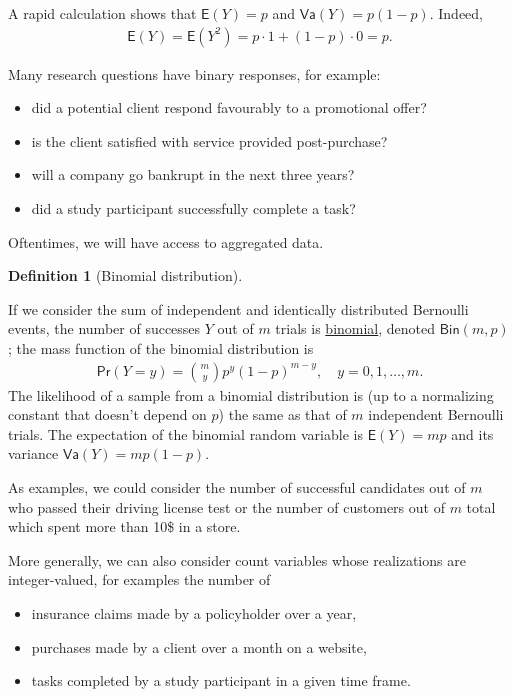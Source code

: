 \documentclass[
  11pt,
  letterpaper,
]{scrbook}
\providecommand{\tightlist}{%
  \setlength{\itemsep}{0pt}\setlength{\parskip}{0pt}}\usepackage{longtable,booktabs,array}
\theoremstyle{plain}
\theoremstyle{definition}
\theoremstyle{definition}
\newtheorem{definition}{Definition}[chapter]
\theoremstyle{plain}
\theoremstyle{remark}
\begin{document}
A rapid calculation shows that \(\mathsf{E}(Y)=p\) and
\(\mathsf{Va}(Y)=p(1-p).\) Indeed, \begin{align*}
\mathsf{E}(Y) = \mathsf{E}(Y^2) = p \cdot 1 + (1-p) \cdot 0 = p.
\end{align*}

Many research questions have binary responses, for example:

\begin{itemize}
\tightlist
\item
  did a potential client respond favourably to a promotional offer?
\item
  is the client satisfied with service provided post-purchase?
\item
  will a company go bankrupt in the next three years?
\item
  did a study participant successfully complete a task?
\end{itemize}

Oftentimes, we will have access to aggregated data.

\begin{definition}[Binomial
distribution]\protect\hypertarget{def-binomialdist}{}\label{def-binomialdist}

If we consider the sum of independent and identically distributed
Bernoulli events, the number of successes \(Y\) out of \(m\) trials is
\href{https://en.wikipedia.org/wiki/Binomial_distribution}{binomial},
denoted \(\mathsf{Bin}(m, p)\); the mass function of the binomial
distribution is \begin{align*}
\mathsf{Pr}(Y=y) = \binom{m}{y}p^y (1-p)^{m-y}, \quad y=0, 1, \ldots, m.
\end{align*} The likelihood of a sample from a binomial distribution is
(up to a normalizing constant that doesn't depend on \(p\)) the same as
that of \(m\) independent Bernoulli trials. The expectation of the
binomial random variable is \(\mathsf{E}(Y)=mp\) and its variance
\(\mathsf{Va}(Y)=mp(1-p).\)

\end{definition}

As examples, we could consider the number of successful candidates out
of \(m\) who passed their driving license test or the number of
customers out of \(m\) total which spent more than 10\$ in a store.

More generally, we can also consider count variables whose realizations
are integer-valued, for examples the number of

\begin{itemize}
\tightlist
\item
  insurance claims made by a policyholder over a year,
\item
  purchases made by a client over a month on a website,
\item
  tasks completed by a study participant in a given time frame.
\end{itemize}
\end{document}
